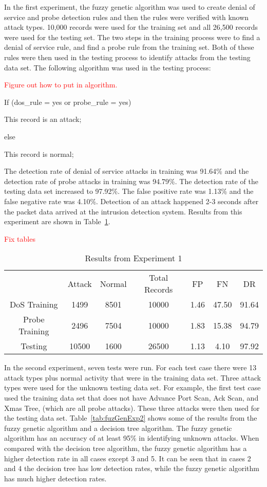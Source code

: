 \documentclass{sig-alternate}
\newcommand{\mycomment}[1]{\textcolor{red}{#1}}
\begin{document}
In the first experiment, the fuzzy genetic algorithm was used to create denial of service and probe detection rules and then the rules were verified with known attack types. 10,000 records were used for the training set and all 26,500 records were used for the testing set. The two steps in the training process were to find a denial of service rule, and find a probe rule from the training set. Both of these rules were then used in the testing process to identify attacks from the testing data set. The following algorithm was used in the testing process:

\mycomment{Figure out how to put in algorithm.}

If (dos\_rule = yes or probe\_rule = yes)

   This record is an attack;

else

   This record is normal;



The detection rate of denial of service attacks in training was 91.64\% and the detection rate of probe attacks in training was 94.79\%. The detection rate of the testing data set increased to 97.92\%. The false positive rate was 1.13\% and the false negative rate was 4.10\%. Detection of an attack happened 2-3 seconds after the packet data arrived at the intrusion detection system. Results from this experiment are shown in Table~\ref{tab:fuzGenExp1}.

\mycomment{Fix tables}

\begin{table}
\caption{Results from Experiment 1}
\begin{tabular}{|ccccccc|} \hline
 & Attack & Normal & Total Records & FP & FN & DR\\
DoS Training & 1499 & 8501 & 10000 & 1.46 & 47.50 & 91.64\\
Probe Training & 2496 & 7504 & 10000 & 1.83 & 15.38 & 94.79\\
Testing & 10500 & 1600 & 26500 & 1.13 & 4.10 & 97.92\\
\hline\end{tabular}
\label{tab:fuzGenExp1}
\end{table}

In the second experiment, seven tests were run. For each test case there were 13 attack types plus normal activity that were in the training data set. Three attack types were used for the unknown testing data set. For example, the first test case used the training data set that does not have Advance Port Scan, Ack Scan, and Xmas Tree, (which are all probe attacks). These three attacks were then used for the testing data set. Table~\ref{tab:fuzGenExp2} shows some of the results from the fuzzy genetic algorithm and a decision tree algorithm. The fuzzy genetic algorithm has an accuracy of at least 95\% in identifying unknown attacks. When compared with the decision tree algorithm, the fuzzy genetic algorithm has a higher detection rate in all cases except 3 and 5. It can be seen that in cases 2 and 4 the decision tree has low detection rates, while the fuzzy genetic algorithm has much higher detection rates.
\end{document}
